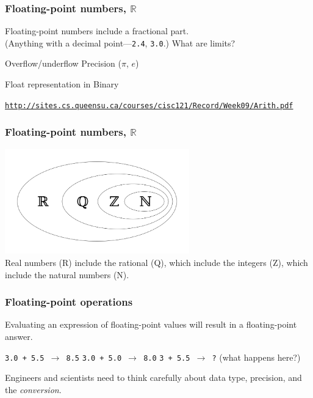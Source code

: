 \documentclass[11pt]{beamer}
\begin{document}
\begin{frame}
  \frametitle{Floating-point numbers, $\mathbb{R}$}
  \Enlarge

  \begin{itemize}
  \myitem  Floating-point numbers include a fractional part. \pause \\
    \textcolor{CS101GradBot}{(Anything with a decimal point---\texttt{2.4}, \texttt{3.0}.)} \pause
  \myitem  What are limits? \pause
    \begin{itemize}
    \mysubitem  Overflow/underflow
    \mysubitem  Precision ($\pi$, $e$) \pause
    \end{itemize}
  \myitem Float representation in Binary
  \end{itemize}
  \textcolor{blue}{\small \texttt{\url{http://sites.cs.queensu.ca/courses/cisc121/Record/Week09/Arith.pdf}}}
\end{frame}

\begin{frame}
  \frametitle{Floating-point numbers, $\mathbb{R}$}
  \Enlarge
  \begin{center}
  \includegraphics[width=0.6\textwidth]{./img/Numbersystems.png}\\
  Real numbers (R) include the rational (Q), which include the integers (Z), which include the natural numbers (N).
  \end{center}
\end{frame}

\begin{frame}
  \frametitle{Floating-point operations}
  \Enlarge

  \begin{itemize}
  \myitem  Evaluating an expression of floating-point values will result in a floating-point answer. \pause
    \begin{itemize}
    \mysubitem  \texttt{3.0 + 5.5 $\rightarrow$ 8.5} \pause
    \mysubitem  \texttt{3.0 + 5.0 $\rightarrow$ 8.0} \pause
    \mysubitem  \texttt{3   + 5.5 $\rightarrow$ ?} (what happens here?)
    \end{itemize} \pause
  \myitem  Engineers and scientists need to think carefully about data type, precision, and the \emph{conversion}.
  \end{itemize}
\end{frame}
\end{document}
